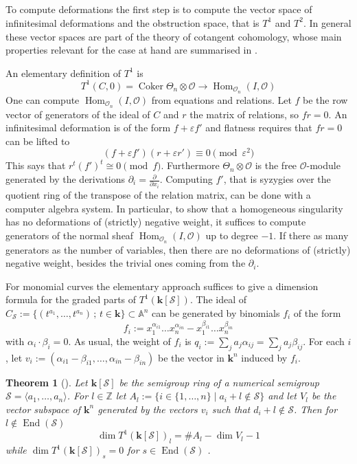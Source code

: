 \documentclass{amsart}
\renewcommand{\S}{\mathcal S}
\renewcommand{\k}{\mathbf{k}} %
\DeclareMathOperator{\Coker}{Coker}
\DeclareMathOperator{\Hom}{Hom}
\DeclareMathOperator{\End}{End}
\renewcommand{\ell}{l}
\newcommand{\mO}{\mathcal{O}}
\newtheorem{thm}{Theorem}[section]
\theoremstyle{definition}
\theoremstyle{remark}
\begin{document}
\subsection{} 
To compute deformations the first step is to compute the vector space of
 infinitesimal deformations and the obstruction space, that is $T^1$ and $T^2$.
 In general  these vector spaces are part of  the theory of cotangent cohomology, 
 whose main properties relevant for the case at hand
 are summarised in \cite{RV}.

 An elementary definition of $T^1$  is
\[
T^1(C,0) = 
 \Coker \Theta_n\otimes \mO \to  \Hom_{\mO_n}(I,\mO)
\]
One can compute $\Hom_{\mO_n}(I,\mO)$ from equations and relations. Let $f$ be the row vector
of generators of the ideal of $C$ and $r$ the matrix of relations, so $fr=0$. An infinitesimal
deformation is of the form $f+\varepsilon f'$ and flatness requires that 
$fr=0$ can be lifted to 
\[
(f+\varepsilon f')(r+\varepsilon r') \equiv 0 \pmod {\varepsilon^2}
\] 
This
says that $r^t( f')^t\cong 0  \pmod {f}$. Furthermore 
$ \Theta_n\otimes \mO$ is the free $\mO$-module generated by the derivations $\partial_i=\frac{\partial}{\partial x_i}$.
Computing $f'$, that is syzygies over the quotient ring  of the transpose of the relation matrix,
can be done with a computer algebra system.
In particular, to show that a homogeneous singularity has no deformations of
(strictly) negative weight, it suffices to compute
generators of the normal sheaf $ \Hom_{\mO_n}(I,\mO)$ up to degree $-1$.
If there as many generators
as the number of variables, then there are no deformations of
(strictly) negative weight, besides the trivial ones
coming from the $\partial_i$.


For monomial curves the elementary approach suffices to give
 a dimension formula for the graded parts of $T^{1}(\k[\S])$. 
The ideal of 
$C_{\S}:=\{(t^{a_1},\dots,t^{a_n})\,;\,t\in \k\}\subset\mathbb{A}^{n}$
can be generated by binomials $f_i$ of the form
\[
f_i:=x_{1}^{\alpha_{i1}}\dots x_{n}^{\alpha_{in}}-x_{1}^{\beta_{i1}}\dots x_{n}^{\beta_{in}}
\]
with $\alpha_i\cdot\beta_i=0$. As usual, the weight of $f_i$ is $q_i:=\sum_j a_j\alpha_{ij}=\sum_j a_j\beta_{ij}$.
For each $i$, let $v_i:=(\alpha_{i1}-\beta_{i1},\dots,\alpha_{in}-\beta_{in})$
be the vector in $\k^{n}$ induced by $f_i$.

\begin{thm}[{\cite[Thm. 2.2.1]{Bu80}}]\label{thm:monomialT1}
Let $\k[\S]$ be the semigroup ring of a numerical semigroup $\S=\langle a_1,\dots,a_n\rangle$.
For $\ell\in\mathbb{Z}$ let $A_{\ell}:=\{i\in\{1,\dots,n\}\mid a_i+\ell\notin\S\}$
and let  $V_{\ell}$ be the vector subspace of $\k^{n}$ generated by the vectors $v_i$
such that $d_i+\ell\notin\S$. Then for $\ell\notin\End(\S)$
\[
\dim T^{1}(\k[\S])_{\ell}=\# A_\ell-\dim V_{\ell}-1
\]
while $\dim T^{1}(\k[\S])_s=0$ for  $s\in\End(\S)$ .
 \end{thm}
\end{document}
